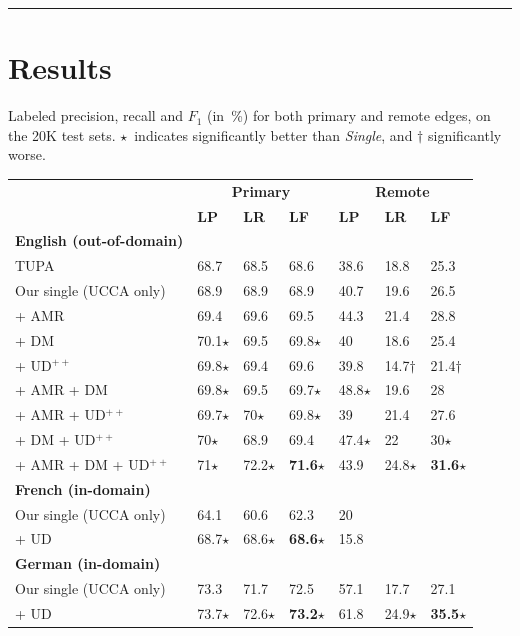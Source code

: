 \documentclass[a0,portrait]{a0poster}
\begin{document}
\begin{multicols}{2}
\vspace{5cm}


\hrule


\section*{Results}

Labeled precision, recall and $F_1$ (in~\%) for both primary and remote edges,
on the 20K test sets.
$\star$~indicates significantly better than \textit{Single},
and $\dagger$ significantly worse.

\begin{center}
\setlength\tabcolsep{1cm}
\begin{tabular}{l|lll|lll}
& \multicolumn{3}{c|}{\bf Primary} & \multicolumn{3}{c}{\bf Remote} \\
& \textbf{LP} & \textbf{LR} & \textbf{LF}
& \textbf{LP} & \textbf{LR} & \textbf{LF} \\
\hline
\bf English (out-of-domain) & \\
TUPA \cite{hershcovich2017a}
& 68.7 & 68.5 & 68.6 & 38.6 & 18.8 & 25.3 \\
Our single (UCCA only)
& 68.9 & 68.9 & 68.9 & 40.7 & 19.6 & 26.5 \\
\cline{1-1}
+ AMR
& 69.4 & 69.6 & 69.5 & 44.3 & 21.4 & 28.8 \\
+ DM
& 70.1$\star$ & 69.5 & 69.8$\star$ & 40 & 18.6 & 25.4 \\
+ UD$^{++}$
& 69.8$\star$ & 69.4 & 69.6 & 39.8 & 14.7$\dagger$ & 21.4$\dagger$ \\
+ AMR + DM
& 69.8$\star$ & 69.5 & 69.7$\star$ & 48.8$\star$ & 19.6 & 28 \\
+ AMR + UD$^{++}$
& 69.7$\star$ & 70$\star$ & 69.8$\star$ & 39 & 21.4 & 27.6 \\
+ DM + UD$^{++}$
& 70$\star$ & 68.9 & 69.4 & 47.4$\star$ & 22 & 30$\star$ \\
+ AMR + DM + UD$^{++}$
& 71$\star$ & 72.2$\star$ & \textbf{71.6}$\star$ & 43.9 & 24.8$\star$ & \textbf{31.6}$\star$ \\
\hline
\bf French (in-domain) & \\
Our single (UCCA only) & 64.1 & 60.6 & 62.3 & 20 & \enskip 5.7 & \enskip 8.8 \\
+ UD & 68.7$\star$ & 68.6$\star$ & \textbf{68.6}$\star$ & 15.8 & \enskip 5.7 & \enskip 8.3 \\
\hline
\bf German (in-domain) & \\
Our single (UCCA only) & 73.3 & 71.7 & 72.5 & 57.1 & 17.7 & 27.1 \\
+ UD & 73.7$\star$ & 72.6$\star$ & \textbf{73.2}$\star$ & 61.8 & 24.9$\star$ & \textbf{35.5}$\star$
\end{tabular}
\end{center}


\end{multicols}
\end{document}
